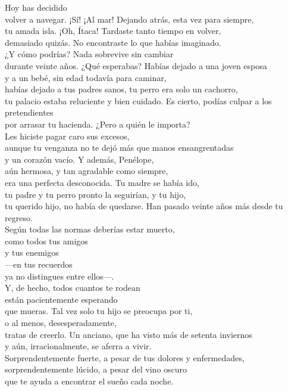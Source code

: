 \begin{versopropio}
Hoy has decidido\\
volver a navegar.
\stanzabreak
¡Sí! ¡Al mar! Dejando atrás, esta vez para siempre,\\
tu amada isla.
\stanzabreak
¡Oh, Ítaca! Tardaste tanto tiempo en volver,\\
demasiado quizás. No encontraste lo que habías imaginado.\\
¿Y cómo podrías? Nada sobrevive sin cambiar\\
durante veinte años.
\stanzabreak
¿Qué esperabas? Habías dejado a una joven esposa\\
y a un bebé, sin edad todavía para caminar,\\
habías dejado a tus padres sanos, tu perro era solo un cachorro,\\
tu palacio estaba reluciente y bien cuidado.
\stanzabreak
Es cierto, podías culpar a los pretendientes\\
por arrasar tu hacienda. ¿Pero a quién le importa?\\
Les hiciste pagar caro sus excesos,\\
aunque tu venganza no te dejó más que manos ensangrentadas\\
y un corazón vacío. Y además, Penélope,\\
aún hermosa, y tan agradable como siempre,\\
era una perfecta desconocida. Tu madre se había ido,\\
tu padre y tu perro pronto la seguirían, y tu hijo,\\
tu querido hijo, no había de quedarse.
\stanzabreak
Han pasado veinte años más desde tu regreso.\\
Según todas las normas deberías estar muerto,\\
como todos tus amigos\\
y tus enemigos\\
---en tus recuerdos\\
ya no distingues entre ellos---.\\
Y, de hecho, todos cuantos te rodean\\
están pacientemente esperando\\
que mueras. Tal vez solo tu hijo se preocupa por ti,\\
o al menos, desesperadamente,\\
tratas de creerlo.
\stanzabreak
Un anciano, que ha visto más de setenta inviernos\\
y aún, irracionalmente, se aferra a vivir.\\
Sorprendentemente fuerte, a pesar de tus dolores y enfermedades,\\
sorprendentemente lúcido, a pesar del vino oscuro\\
que te ayuda a encontrar el sueño cada noche.
\end{versopropio}

